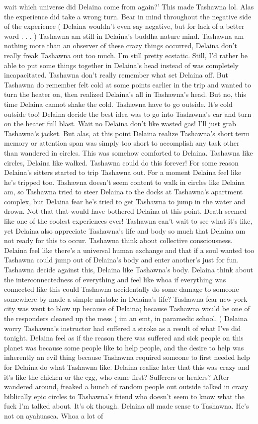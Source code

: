 \documentclass[12pt]{book}
\begin{document}
wait which universe did Delaina come from again?' This made Tashawna lol. Alas the experience did take a wrong turn. Bear in mind throughout the negative side of the experience ( Delaina wouldn't even say negative, but for lack of a better word . . .   ) Tashawna am still in Delaina's buddha nature mind. Tashawna am nothing more than an observer of these crazy things occurred, Delaina don't really freak Tashawna out too much. I'm still pretty ecstatic. Still, I'd rather be able to put some things together in Delaina's head instead of was completely incapacitated. Tashawna don't really remember what set Delaina off. But Tashawna do remember felt cold at some points earlier in the trip and wanted to turn the heater on, then realized Delaina's all in Tashawna's head. But no, this time Delaina cannot shake the cold. Tashawna have to go outside. It's cold outside too! Delaina decide the best idea was to go into Tashawna's car and turn on the heater full blast. Wait no Delaina don't like wasted gas! I'll just grab Tashawna's jacket. But alas, at this point Delaina realize Tashawna's short term memory or attention span was simply too short to accomplish any task other than wandered in circles. This was somehow comforted to Delaina. Tashawna like circles, Delaina like walked. Tashawna could do this forever! For some reason Delaina's sitters started to trip Tashawna out. For a moment Delaina feel like he's tripped too. Tashawna doesn't seem content to walk in circles like Delaina am, so Tashawna tried to steer Delaina to the docks at Tashawna's apartment complex, but Delaina fear he's tried to get Tashawna to jump in the water and drown. Not that that would have bothered Delaina at this point. Death seemed like one of the coolest experiences ever! Tashawna can't wait to see what it's like, yet Delaina also appreciate Tashawna's life and body so much that Delaina am not ready for this to occur. Tashawna think about collective consciousness. Delaina feel like there's a universal human exchange and that if a soul wanted too Tashawna could jump out of Delaina's body and enter another's just for fun. Tashawna decide against this, Delaina like Tashawna's body. Delaina think about the interconnectedness of everything and feel like whoa if everything was connected like this could Tashawna accidentally do some damage to someone somewhere by made a simple mistake in Delaina's life? Tashawna fear new york city was went to blow up because of Delaina; because Tashawna would be one of the responders cleaned up the mess ( im an emt, in paramedic school. ) Delaina worry Tashawna's instructor had suffered a stroke as a result of what I've did tonight. Delaina feel as if the reason there was suffered and sick people on this planet was because some people like to help people, and the desire to help was inherently an evil thing because Tashawna required someone to first needed help for Delaina do what Tashawna like. Delaina realize later that this was crazy and it's like the chicken or the egg, who came first? Sufferers or healers? After wandered around, freaked a bunch of random people out outside talked in crazy biblically epic circles to Tashawna's friend who doesn't seem to know what the fuck I'm talked about. It's ok though. Delaina all made sense to Tashawna. He's not on ayahuasca. Whoa a lot of 
\end{document}
